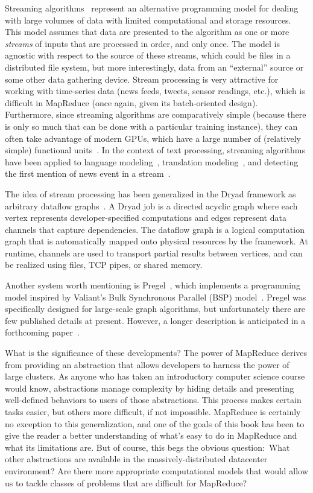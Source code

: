 Streaming algorithms~\cite{Alon_1996} represent an alternative
programming model for dealing with large volumes of data with limited
computational and storage resources.  This model assumes that data are
presented to the algorithm as one or more \emph{streams} of inputs
that are processed in order, and only once.  The model is agnostic
with respect to the source of these streams, which could be files in a
distributed file system, but more interestingly, data from an
``external'' source or some other data gathering device.  Stream
processing is very attractive for working with time-series data (news
feeds, tweets, sensor readings, etc.), which is difficult in MapReduce
(once again, given its batch-oriented design).  Furthermore, since
streaming algorithms are comparatively simple (because there is only
so much that can be done with a particular training instance), they
can often take advantage of modern GPUs, which have a large number of
(relatively simple) functional units~\cite{McCool_2008}.  In the
context of text processing, streaming algorithms have been applied to
language modeling~\cite{Levenberg_2009}, translation
modeling~\cite{Levenberg_2010}, and detecting the first mention of
news event in a stream~\cite{Petrovic_2010}.

The idea of stream processing has been generalized in the Dryad
framework as arbitrary dataflow
graphs~\cite{Isard_etal_2007,YuYuan_etal_OSDI2008}.  A Dryad job is a
directed acyclic graph where each vertex represents
developer-specified computations and edges represent data channels
that capture dependencies.  The dataflow graph is a logical
computation graph that is automatically mapped onto physical resources
by the framework.  At runtime, channels are used to transport partial
results between vertices, and can be realized using files, TCP pipes,
or shared memory.

Another system worth mentioning is Pregel~\cite{Malewicz_etal_2009},
which implements a programming model inspired by Valiant's Bulk
Synchronous Parallel (BSP) model~\cite{Valiant_CACM1990}.  Pregel was
specifically designed for large-scale graph algorithms, but
unfortunately there are few published details at present.  However, a
longer description is anticipated in a forthcoming
paper~\cite{Malewicz_etal_SIGMOD2010}.

What is the significance of these developments?  The power of
MapReduce derives from providing an abstraction that allows developers
to harness the power of large clusters.  As anyone who has taken an
introductory computer science course would know, abstractions manage
complexity by hiding details and presenting well-defined behaviors to
users of those abstractions.  This process makes certain tasks easier,
but others more difficult, if not impossible.  MapReduce is certainly
no exception to this generalization, and one of the goals of this book
has been to give the reader a better understanding of what's easy to
do in MapReduce and what its limitations are.  But of course, this
begs the obvious question:\ What other abstractions are available in
the massively-distributed datacenter environment?  Are there more
appropriate computational models that would allow us to tackle classes
of problems that are difficult for MapReduce?

